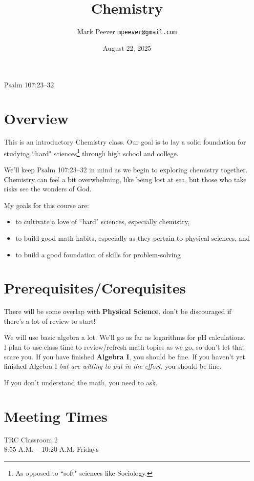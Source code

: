 \documentclass[11pt, oneside]{article}   	%
\title{Chemistry}
\author{Mark Peever \texttt{mpeever@gmail.com}}
\date{August 22, 2025}
\begin{document}
\maketitle

\begin{center}
Psalm 107:23--32
\end{center}

\section{Overview}
This is an introductory Chemistry class. Our goal is to lay a solid foundation for studying ``hard" sciences\footnote{As opposed to ``soft" sciences like Sociology.} through high school and college. 

We'll keep Psalm 107:23--32 in mind as we begin to exploring chemistry together. Chemistry can feel a bit overwhelming, like being lost at sea, but those who take risks see the wonders of God.

My goals for this course are:
\begin{itemize}
\item to cultivate a love of ``hard" sciences, especially chemistry,
\item to build good math habits, especially as they pertain to physical sciences, and
\item to build a good foundation of skills for problem-solving
\end{itemize}

\section{Prerequisites/Corequisites}
There will be some overlap with \textbf{Physical Science}, don't be discouraged if there's a lot of review to start!

We will use basic algebra a lot. 
We'll go as far as logarithms for pH calculations.  
I plan to use class time to review/refresh math topics as we go, so don't let that scare you.
If you have finished \textbf{Algebra I}, you should be fine. 
If you haven't yet finished Algebra I \emph{but are willing to put in the effort}, you should be fine.

If you don't understand the math, you need to ask.

\section{Meeting Times}
TRC Classroom 2       \\
8:55 A.M. -- 10:20 A.M. Fridays \\ 
\end{document}
